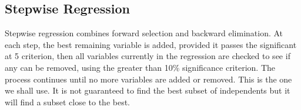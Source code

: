 \documentclass[a4paper,12pt]{article}
\begin{document}
\subsection{Stepwise Regression}
Stepwise regression combines forward selection and backward elimination. At each
step, the best remaining variable is added, provided it passes the significant at 5%
criterion, then all variables currently in the regression are checked to see if any can be
removed, using the greater than 10\% significance criterion. The process continues
until no more variables are added or removed. This is the one we shall use. It is not
guaranteed to find the best subset of independents but it will find a subset close to the
best.
%
%

%
%
%
%



%


\end{document}
